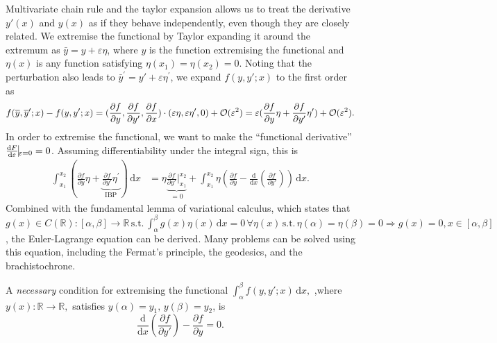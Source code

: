 \documentclass{article}
\theoremstyle{nonumberplain}
\begin{document}
Multivariate chain rule and the taylor expansion allows us to treat the derivative $y' (x)$ and $y(x)$ as if they behave independently, even though they are closely related. We extremise the functional by Taylor expanding it around the extremum as $\bar{y} = y + \varepsilon \eta$, where $y$ is the function extremising the functional and $\eta(x)$ is any function satisfying $\eta (x_1) = \eta (x_2) = 0$. Noting that the perturbation also leads to $\bar{y}^\prime = y'  + \varepsilon \eta ^\prime $, we expand $f(y, y' ; x)$ to the first order as
\[
    f(\overline{y}, \overline{y}^\prime ; x ) - f(y,y' ; x )
    = (\frac{\partial f}{\partial y} , \frac{\partial f}{\partial y' } , \frac{\partial f}{\partial x} ) \cdot (\varepsilon \eta , \varepsilon \eta ^\prime ,0) + \mathcal{\MakeUppercase{o}}(\varepsilon ^2) 
    = \varepsilon (\frac{\partial f}{\partial y} \eta  + \frac{\partial f}{\partial y' } \eta ^\prime ) + \mathcal{\MakeUppercase{o}}(\varepsilon^2). 
\]
In order to extremise the functional, we want to make the ``functional derivative'' $\frac{\mathrm{d}F}{\mathrm{d}\varepsilon }\vline_{\varepsilon =0} = 0$. Assuming differentiability under the integral sign, this is 
\[
    \begin{aligned}
        \int_{x_1}^{x_2}  (\frac{\partial f}{\partial y} \eta  + \underbrace{\frac{\partial f}{\partial y' }\eta ^\prime}_\text{IBP} )\,\mathrm{d}x 
        &= \eta \underbrace{\frac{\partial f}{\partial y' } \bigg\rvert^{x_2}_{x_1}}_{=0} + 
        \int_{x_1}^{x_2}  \eta \left( \frac{\partial f}{\partial y}   -  \frac{\mathrm{d}}{\mathrm{d}x} \left(\frac{\partial f}{\partial y' } \right) \right) \,\mathrm{d}x.
    \end{aligned}
\]
Combined with the fundamental lemma of variational calculus, which states that \(
    g(x) \in C(\mathbb{R}) 
        \colon [\alpha ,\beta ] \to \mathbb{R} \, \text{s.t.} \, \int_{\alpha }^{\beta } g(x)\eta (x) \,\mathrm{d}x =0 \, \forall \eta(x) \, \text{s.t.} \, \eta (\alpha ) = \eta (\beta ) = 0 \Rightarrow g(x)=0, x \in [\alpha , \beta ]
\), the Euler-Lagrange equation can be derived. Many problems can be solved using this equation, including the Fermat's principle, the geodesics, and the brachistochrone. 
\begin{frm-thm}
    A \textit{necessary} condition for extremising the functional 
    \(
        \int_{\alpha }^{\beta } f(y,y' ; x ) \,\mathrm{d}x, 
    \) 
    ,where $y(x)
        \colon \mathbb{R} \to \mathbb{R},
    $ satisfies $y(\alpha ) = y_1, \, y(\beta ) = y_2$,
    is
    \[
        \frac{\mathrm{d}}{\mathrm{d}x} \left(\frac{\partial f}{\partial y' } \right)
        - \frac{\partial f}{\partial y} =0.
    \]
\end{frm-thm}
\end{document}
